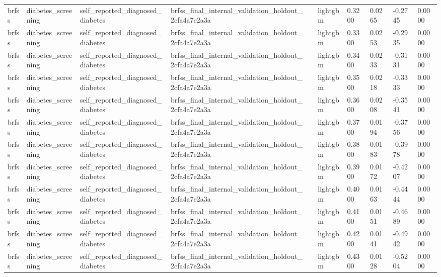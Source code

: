 \begin{tabular}{llllllllll}
brfss & diabetes\_screening & self\_reported\_diagnosed\_diabetes & brfss\_final\_internal\_validation\_holdout\_2cfa4a7e2a3a &  & lightgbm & 0.3200 & 0.0265 & -0.2745 & 0.0000 \\
brfss & diabetes\_screening & self\_reported\_diagnosed\_diabetes & brfss\_final\_internal\_validation\_holdout\_2cfa4a7e2a3a &  & lightgbm & 0.3300 & 0.0253 & -0.2935 & 0.0000 \\
brfss & diabetes\_screening & self\_reported\_diagnosed\_diabetes & brfss\_final\_internal\_validation\_holdout\_2cfa4a7e2a3a &  & lightgbm & 0.3400 & 0.0233 & -0.3131 & 0.0000 \\
brfss & diabetes\_screening & self\_reported\_diagnosed\_diabetes & brfss\_final\_internal\_validation\_holdout\_2cfa4a7e2a3a &  & lightgbm & 0.3500 & 0.0218 & -0.3333 & 0.0000 \\
brfss & diabetes\_screening & self\_reported\_diagnosed\_diabetes & brfss\_final\_internal\_validation\_holdout\_2cfa4a7e2a3a &  & lightgbm & 0.3600 & 0.0208 & -0.3541 & 0.0000 \\
brfss & diabetes\_screening & self\_reported\_diagnosed\_diabetes & brfss\_final\_internal\_validation\_holdout\_2cfa4a7e2a3a &  & lightgbm & 0.3700 & 0.0194 & -0.3756 & 0.0000 \\
brfss & diabetes\_screening & self\_reported\_diagnosed\_diabetes & brfss\_final\_internal\_validation\_holdout\_2cfa4a7e2a3a &  & lightgbm & 0.3800 & 0.0183 & -0.3978 & 0.0000 \\
brfss & diabetes\_screening & self\_reported\_diagnosed\_diabetes & brfss\_final\_internal\_validation\_holdout\_2cfa4a7e2a3a &  & lightgbm & 0.3900 & 0.0172 & -0.4207 & 0.0000 \\
brfss & diabetes\_screening & self\_reported\_diagnosed\_diabetes & brfss\_final\_internal\_validation\_holdout\_2cfa4a7e2a3a &  & lightgbm & 0.4000 & 0.0163 & -0.4444 & 0.0000 \\
brfss & diabetes\_screening & self\_reported\_diagnosed\_diabetes & brfss\_final\_internal\_validation\_holdout\_2cfa4a7e2a3a &  & lightgbm & 0.4100 & 0.0151 & -0.4689 & 0.0000 \\
brfss & diabetes\_screening & self\_reported\_diagnosed\_diabetes & brfss\_final\_internal\_validation\_holdout\_2cfa4a7e2a3a &  & lightgbm & 0.4200 & 0.0141 & -0.4942 & 0.0000 \\
brfss & diabetes\_screening & self\_reported\_diagnosed\_diabetes & brfss\_final\_internal\_validation\_holdout\_2cfa4a7e2a3a &  & lightgbm & 0.4300 & 0.0128 & -0.5204 & 0.0000 \\

\end{tabular}
